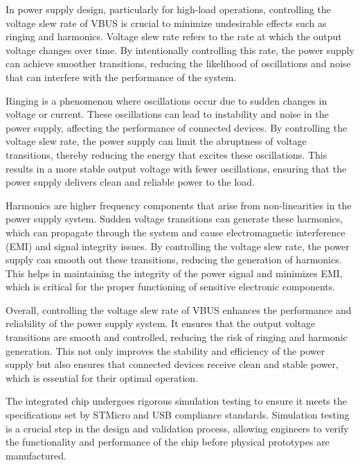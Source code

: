 In power supply design, particularly for high-load operations, controlling the voltage slew rate of VBUS is crucial to minimize undesirable effects such as ringing and harmonics. Voltage slew rate refers to the rate at which the output voltage changes over time. By intentionally controlling this rate, the power supply can achieve smoother transitions, reducing the likelihood of oscillations and noise that can interfere with the performance of the system.

Ringing is a phenomenon where oscillations occur due to sudden changes in voltage or current. These oscillations can lead to instability and noise in the power supply, affecting the performance of connected devices. By controlling the voltage slew rate, the power supply can limit the abruptness of voltage transitions, thereby reducing the energy that excites these oscillations. This results in a more stable output voltage with fewer oscillations, ensuring that the power supply delivers clean and reliable power to the load.

Harmonics are higher frequency components that arise from non-linearities in the power supply system. Sudden voltage transitions can generate these harmonics, which can propagate through the system and cause electromagnetic interference (EMI) and signal integrity issues. By controlling the voltage slew rate, the power supply can smooth out these transitions, reducing the generation of harmonics. This helps in maintaining the integrity of the power signal and minimizes EMI, which is critical for the proper functioning of sensitive electronic components.

Overall, controlling the voltage slew rate of VBUS enhances the performance and reliability of the power supply system. It ensures that the output voltage transitions are smooth and controlled, reducing the risk of ringing and harmonic generation. This not only improves the stability and efficiency of the power supply but also ensures that connected devices receive clean and stable power, which is essential for their optimal operation.

The integrated chip undergoes rigorous simulation testing to ensure it meets the specifications set by STMicro and USB compliance standards. Simulation testing is a crucial step in the design and validation process, allowing engineers to verify the functionality and performance of the chip before physical prototypes are manufactured. 

